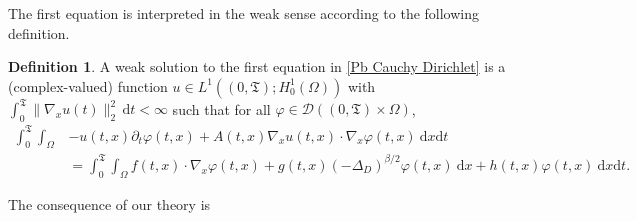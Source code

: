 \documentclass[11pt, letterpaper]{amsart}
\theoremstyle{definition}
\newtheorem{defn}[thm]{Definition}
\theoremstyle{remark}
\numberwithin{equation}{section}
\begin{document}
The first equation is interpreted in the weak sense according to the following definition.
\begin{defn}\label{defn:Dirichlet}
    A weak solution to the first equation in \eqref{Pb Cauchy Dirichlet} is a (complex-valued) {function $u \in L^1((0,\mathfrak{T});H^1_0(\Omega))$ with $\int_0^\mathfrak{T}\|\nabla_x u(t)\|^2_2\, \mathrm{d}t<\infty$} such that     for all $\varphi \in \mathcal{D}((0,\mathfrak{T})\times \Omega)$,
    \begin{align*}
        \int_{0}^{\mathfrak{T}}\int_\Omega 
        &- u(t,x) \partial_t \varphi(t,x)+A(t,x)\nabla_x u(t,x) \cdot \nabla_x \varphi(t,x) \ \mathrm{d}x \mathrm{d}t
        \\& = \int_{0}^{\mathfrak{T}}\int_\Omega {f}(t,x) \cdot \nabla_x \varphi(t,x)+  {g}(t,x) (-\Delta_D)^{\beta/2} \varphi(t,x) \ \mathrm{d}x +h(t,x)\varphi(t,x)\  \mathrm{d}x\mathrm{d}t.
    \end{align*}
\end{defn}
The consequence of our theory is
\end{document}
